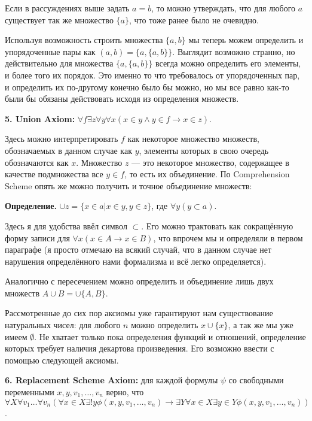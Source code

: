 Если в рассуждениях выше задать $a = b$, то можно утверждать, что для любого $a$ существует так же множество $\{a\}$, что тоже ранее было не очевидно.

Используя возможность строить множества $\{a, b\}$ мы теперь можем определить и упорядоченные пары как $(a, b) = \{a, \{a, b\}\}$. Выглядит возможно странно, но действительно для множества $\{a, \{a, b\}\}$ всегда можно определить его элементы, и более того их порядок. Это именно то что требовалось от упорядоченных пар, и определить их по-другому конечно было бы можно, но мы все равно как-то были бы обязаны действовать исходя из определения множеств.

{\bfseries 5. Union Axiom:} $\forall f \exists z \forall y \forall x (x \in y \wedge y \in f \rightarrow x \in z)$.

Здесь можно интерпретировать $f$ как некоторое множество множеств, обозначаемых в данном случае как $y$, элементы которых в свою очередь обозначаются как $x$. Множество $z$ — это некоторое множество, содержащее в качестве подмножества все $y \in f$, то есть их объединение. По Comprehension Scheme опять же можно получить и точное объединение множеств:

{\bfseries Определение.} $\cup z = \{x \in a|x\in y, y\in z\}$, где $\forall y (y \subset a)$.

Здесь я для удобства ввёл символ $\subset$. Его можно трактовать как сокращённую форму записи для $\forall x (x\in A \rightarrow x \in B)$, что впрочем мы и определяли в первом параграфе (я просто отмечаю на всякий случай, что в данном случае нет нарушения определённого нами формализма и всё легко определяется).

Аналогично с пересечением можно определить и объединение лишь двух множеств $A\cup B = \cup \{A, B\}$.

Рассмотренные до сих пор аксиомы уже гарантируют нам существование натуральных чисел: для любого $n$ можно определить $x\cup\{x\}$, а так же мы уже имеем $\emptyset$. Не хватает только пока определения функций и отношений, определение которых требует наличия декартова произведения. Его возможно ввести с помощью следующей аксиомы.

{\bfseries 6. Replacement Scheme Axiom:} для каждой формулы $\psi$ со свободными переменными $x, y, v_1, \ldots, v_n$ верно, что $\forall X \forall v_1 \ldots \forall v_n (\forall x\in X \exists ! y \phi(x, y, v_1, \ldots, v_n) \rightarrow \exists Y \forall x \in X \exists y \in Y \phi(x, y, v_1, \ldots, v_n))$.

